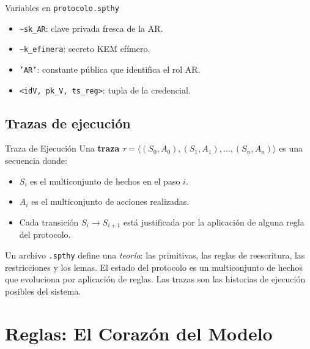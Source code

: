 \documentclass[12pt, a4paper, twoside, openright]{book}
\begin{document}
\begin{cajaEjemplo}{Variables en \texttt{protocolo.spthy}}
  \begin{itemize}[itemsep=3pt]
    \item \texttt{\textasciitilde sk\_AR}: clave privada fresca de la AR.
    \item \texttt{\textasciitilde k\_efimera}: secreto KEM ef\'imero.
    \item \texttt{'AR'}: constante p\'ublica que identifica el rol AR.
    \item \texttt{<idV, pk\_V, ts\_reg>}: tupla de la credencial.
  \end{itemize}
\end{cajaEjemplo}

\section{Trazas de ejecuci\'on}

\begin{cajaDef}{Traza de Ejecuci\'on}
  Una \textbf{traza} $\tau = \langle (S_0, A_0), (S_1, A_1), \ldots,
  (S_n, A_n) \rangle$ es una secuencia donde:
  \begin{itemize}[itemsep=2pt]
    \item $S_i$ es el multiconjunto de hechos en el paso $i$.
    \item $A_i$ es el multiconjunto de acciones realizadas.
    \item Cada transici\'on $S_i \to S_{i+1}$ est\'a justificada por
      la aplicaci\'on de alguna regla del protocolo.
  \end{itemize}
\end{cajaDef}

\begin{cajaResumen}
  Un archivo \texttt{.spthy} define una \emph{teor\'ia}: las
  primitivas, las reglas de reescritura, las restricciones y los
  lemas. El estado del protocolo es un multiconjunto de hechos que
  evoluciona por aplicaci\'on de reglas. Las trazas son las historias
  de ejecuci\'on posibles del sistema.
\end{cajaResumen}

\chapter{Reglas: El Coraz\'on del Modelo}
\end{document}
